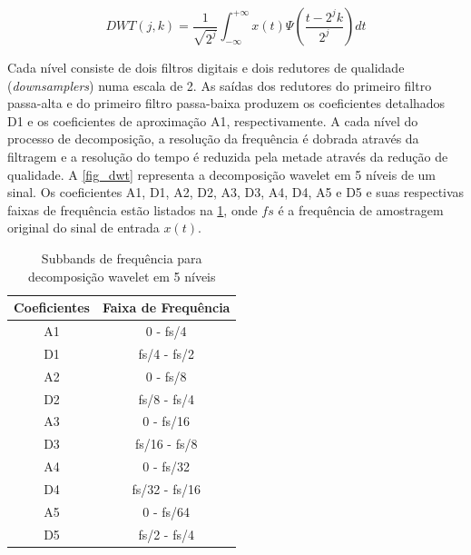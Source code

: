 \documentclass[10pt,journal,compsoc]{IEEEtran}
\begin{document}
\begin{equation}\label{eq_dwt}
DWT(j,k) = \frac{1}{\sqrt{2^j}} \int_{-\infty}^{+\infty} x(t)\Psi(\frac{t-2^jk}{2^j})dt  
\end{equation} 

Cada nível consiste de dois filtros digitais e dois redutores de qualidade (\textit{downsamplers}) numa escala de 2. As saídas dos redutores do primeiro filtro passa-alta e do primeiro filtro passa-baixa produzem os coeficientes detalhados D1 e os coeficientes de aproximação A1, respectivamente. A cada nível do processo de decomposição, a resolução da frequência é dobrada através da filtragem e a resolução do tempo é reduzida pela metade através da redução de qualidade. A \ref{fig_dwt} representa a decomposição wavelet em 5 níveis de um sinal. Os coeficientes A1, D1, A2, D2, A3, D3, A4, D4, A5 e D5 e suas respectivas faixas de frequência estão listados na \ref{table_subsdwt}, onde $ fs $ é a frequência de amostragem original do sinal de entrada $ x(t) $.
\cite{Sharmila2017670}

\begin{table}[!t]
	\renewcommand{\arraystretch}{1.3}
	\caption{Subbands de frequência para decomposição wavelet em 5 níveis}
	\label{table_subsdwt}
	\centering
	\begin{tabular}{c c}
		\hline
		\bfseries Coeficientes & \bfseries Faixa de Frequência \\
		\hline
		
			A1 & 0 - fs/4 		\\
			D1 & fs/4 - fs/2 	\\
			A2 & 0 - fs/8 		\\
			D2 & fs/8 - fs/4 	\\		
			A3 & 0 - fs/16 		\\
			D3 & fs/16 - fs/8 	\\
			A4 & 0 - fs/32 		\\
			D4 & fs/32 - fs/16 	\\
			A5 & 0 - fs/64 		\\
			D5 & fs/2 - fs/4 	\\	
		
		\hline
		
	\end{tabular}
\end{table}
\end{document}
